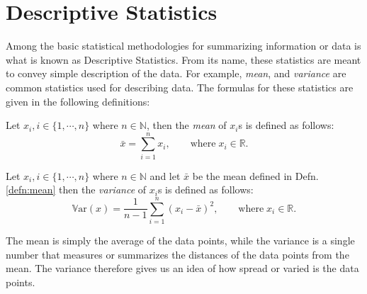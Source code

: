 \section{Descriptive Statistics}\label{sec:descriptive_stat_method}
Among the basic statistical methodologies for summarizing information or data is what is known as Descriptive Statistics. From its name, these statistics are meant to convey simple description of the data. For example, \textit{mean}, and \textit{variance} are common statistics used for describing data. The formulas for these statistics are given in the following definitions:
\begin{defnx}[Mean]\label{defn:mean}
Let $x_i, i\in\{1,\cdots,n\}$ where $n\in\mathbb{N}$, then the \textit{mean} of $x_i$s is defined as follows:
\begin{equation}
    \bar{x} = \sum_{i=1}^n x_i, \qquad\text{where}\;x_i \in\mathbb{R}.
\end{equation}
\end{defnx}
\begin{defnx}[Variance]
    Let $x_i, i\in\{1,\cdots,n\}$ where $n\in\mathbb{N}$ and let $\bar{x}$ be the mean defined in Defn. \ref{defn:mean} then the \textit{variance} of $x_i$s is defined as follows:
    \begin{equation}
        \mathbb{V}\text{ar}(x) = \frac{1}{n-1}\sum_{i=1}^n (x_i-\bar{x})^2, \qquad\text{where}\;x_i \in\mathbb{R}.
    \end{equation}    
\end{defnx}
The mean is simply the average of the data points, while the variance is a single number that measures or summarizes the distances of the data points from the mean. The variance therefore gives us an idea of how spread or varied is the data points.

